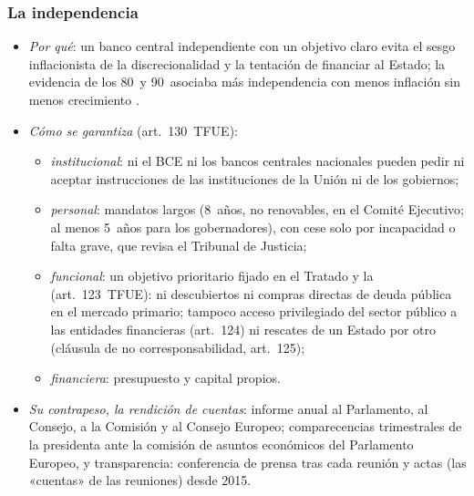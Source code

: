 \documentclass[11pt]{article}
\begin{document}
\begin{infografia}[H]
\centering
\caption{El SEBC, el Eurosistema y los órganos rectores del BCE (2026)}\label{figu:organos}
\end{infografia}

\subsubsection{La independencia}\label{sec:independencia}

\begin{itemize}
\item \emph{Por qué}: un banco central independiente con un objetivo claro evita el sesgo inflacionista de la discrecionalidad y la tentación de financiar al Estado; la evidencia de los 80~y 90~asociaba más independencia con menos inflación sin menos crecimiento\nocite{AlesinaSummers1993Central} .
\item \emph{Cómo se garantiza} (art.~130~TFUE):
  \begin{itemize}
  \item \emph{institucional}: ni el BCE ni los bancos centrales nacionales pueden pedir ni aceptar instrucciones de las instituciones de la Unión ni de los gobiernos;
  \item \emph{personal}: mandatos largos (8~años, no renovables, en el Comité Ejecutivo; al menos 5~años para los gobernadores), con cese solo por incapacidad o falta grave, que revisa el Tribunal de Justicia;
  \item \emph{funcional}: un objetivo prioritario fijado en el Tratado y la  (art.~123~TFUE): ni descubiertos ni compras directas de deuda pública en el mercado primario; tampoco acceso privilegiado del sector público a las entidades financieras (art.~124) ni rescates de un Estado por otro (cláusula de no corresponsabilidad, art.~125);
  \item \emph{financiera}: presupuesto y capital propios.
  \end{itemize}
\item \emph{Su contrapeso, la rendición de cuentas}: informe anual al Parlamento, al Consejo, a la Comisión y al Consejo Europeo; comparecencias trimestrales de la presidenta ante la comisión de asuntos económicos del Parlamento Europeo, y transparencia: conferencia de prensa tras cada reunión y actas (las «cuentas» de las reuniones) desde 2015.
\end{itemize}
\end{document}
